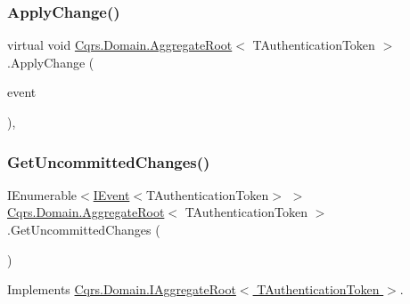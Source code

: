 \subsubsection{\texorpdfstring{Apply\+Change()}{ApplyChange()}}
{\footnotesize\ttfamily virtual void \hyperlink{classCqrs_1_1Domain_1_1AggregateRoot}{Cqrs.\+Domain.\+Aggregate\+Root}$<$ T\+Authentication\+Token $>$.Apply\+Change (\begin{DoxyParamCaption}\item[{\hyperlink{interfaceCqrs_1_1Events_1_1IEvent}{I\+Event}$<$ T\+Authentication\+Token $>$ @}]{event }\end{DoxyParamCaption})\hspace{0.3cm}{\ttfamily [protected]}, {\ttfamily [virtual]}}

\mbox{\label{classCqrs_1_1Domain_1_1AggregateRoot_a625e885ec7885a686f729ed1efe3a8fa_a625e885ec7885a686f729ed1efe3a8fa}} 
\subsubsection{\texorpdfstring{Get\+Uncommitted\+Changes()}{GetUncommittedChanges()}}
{\footnotesize\ttfamily I\+Enumerable$<$\hyperlink{interfaceCqrs_1_1Events_1_1IEvent}{I\+Event}$<$T\+Authentication\+Token$>$ $>$ \hyperlink{classCqrs_1_1Domain_1_1AggregateRoot}{Cqrs.\+Domain.\+Aggregate\+Root}$<$ T\+Authentication\+Token $>$.Get\+Uncommitted\+Changes (\begin{DoxyParamCaption}{ }\end{DoxyParamCaption})}



Implements \hyperlink{interfaceCqrs_1_1Domain_1_1IAggregateRoot_a22fda414613f5ac0d4371554d7d6473b_a22fda414613f5ac0d4371554d7d6473b}{Cqrs.\+Domain.\+I\+Aggregate\+Root$<$ T\+Authentication\+Token $>$}.

\mbox{\label{classCqrs_1_1Domain_1_1AggregateRoot_aec873ad6e4c98309cad2d9f1c534aebb_aec873ad6e4c98309cad2d9f1c534aebb}} 
